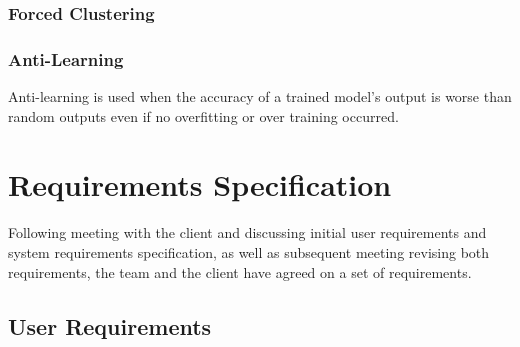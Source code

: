 \documentclass[a4paper,titlepage]{article}
\begin{document}
\subsubsection*{Forced Clustering}
\subsubsection*{Anti-Learning}
Anti-learning is used when the accuracy of a trained model's output is worse than random outputs even if no overfitting or over training occurred.

\section{Requirements Specification}
Following meeting with the client and discussing initial user requirements and system requirements specification, as well as subsequent meeting revising both requirements, the team and the client have agreed on a set of requirements.

\subsection{User Requirements}
\end{document}
